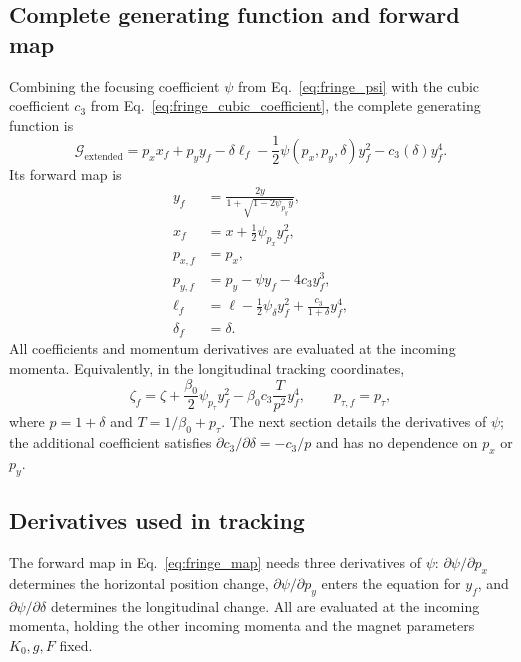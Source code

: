 \subsection{Complete generating function and forward map}
Combining the focusing coefficient $\psi$ from Eq.~\eqref{eq:fringe_psi}
with the cubic coefficient $c_3$ from
Eq.~\eqref{eq:fringe_cubic_coefficient}, the complete generating function is
\begin{equation}
 \mathcal G_{\mathrm{extended}}
 =p_xx_f+p_yy_f-\delta\ell_f
  -\frac12\psi(p_x,p_y,\delta)y_f^2-c_3(\delta)y_f^4.
 \label{eq:fringe_complete_generating_function}
\end{equation}
Its forward map is
\begin{equation}
\begin{aligned}
 y_f&=\frac{2y}{1+\sqrt{1-2\psi_{p_y}y}},\\
 x_f&=x+\frac12\psi_{p_x}y_f^2,\\
 p_{x,f}&=p_x,\\
 p_{y,f}&=p_y-\psi y_f-4c_3y_f^3,\\
 \ell_f&=\ell-\frac12\psi_\delta y_f^2
                  +\frac{c_3}{1+\delta}y_f^4,\\
 \delta_f&=\delta.
\end{aligned}
\label{eq:fringe_complete_map}
\end{equation}
All coefficients and momentum derivatives are evaluated at the incoming
momenta. Equivalently, in the longitudinal tracking coordinates,
\begin{equation}
 \zeta_f=\zeta+\frac{\beta_0}{2}\psi_{p_\tau}y_f^2
              -\beta_0c_3\frac{T}{p^2}y_f^4,
 \qquad p_{\tau,f}=p_\tau,
\end{equation}
where $p=1+\delta$ and $T=1/\beta_0+p_\tau$. The next section details
the derivatives of $\psi$; the additional coefficient satisfies
$\partial c_3/\partial\delta=-c_3/p$ and has no dependence on $p_x$ or $p_y$.

\subsection{Derivatives used in tracking}

The forward map in Eq.~\eqref{eq:fringe_map} needs three derivatives of
$\psi$: $\partial\psi/\partial p_x$ determines the horizontal position
change, $\partial\psi/\partial p_y$ enters the equation for $y_f$, and
$\partial\psi/\partial\delta$ determines the longitudinal change. All are
evaluated at the incoming momenta, holding the other incoming momenta and
the magnet parameters $K_0,g,F$ fixed.

